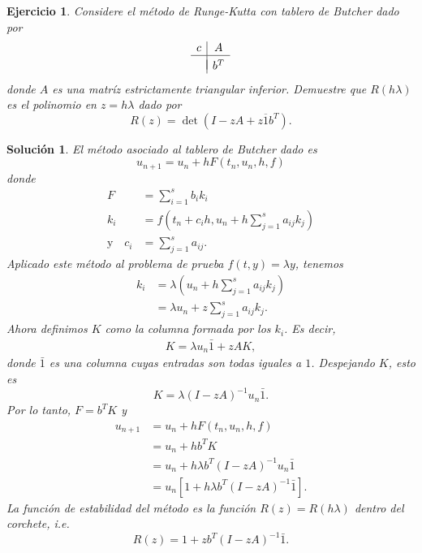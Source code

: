 \documentclass[11pt]{article}
\newtheorem{exercise}{Ejercicio}
\newtheorem*{sol}{Solución}
\newcommand\ol\overline
\begin{document}
\begin{exercise}
  Considere el método de Runge-Kutta con tablero de Butcher dado por
  \begin{equation}
    \begin{array}{c|c}
      c & A \\
      \hline \\[-3mm]
        & b^T
    \end{array}
  \end{equation}
  donde $A$ es una matríz estrictamente triangular inferior. Demuestre
  que $R(h\lambda)$ es el polinomio en $z=h\lambda$ dado por 
   \begin{equation}
    R(z) = \det(I-zA+z\ol 1 b^T)
  .\end{equation}
\end{exercise}
\begin{sol}
  El método asociado al tablero de Butcher dado es
  \begin{equation}
    u_{n+1} = u_n + h F(t_n,u_n,h,f)
  \end{equation}
  donde
  \begin{align}
    F
      &=
      \sum_{i=1}^{s}b_ik_i
    \\[-3mm]
    k_i
      &= f(t_n+c_ih, u_n+h \sum_{j=1}^{s}a_{ij} k_j)
      \\[-4mm]
    \text{y} \quad
    c_i
      &= \sum_{j=1}^{s}a_{ij}
  .\end{align}
  Aplicado este método al problema de prueba $f(t,y)=\lambda y$,
  tenemos
  \begin{align}
    k_i
    &= \lambda(u_n+h \sum_{j=1}^{s}a_{ij} k_j) \\
    &= \lambda u_n+z \sum_{j=1}^{s}a_{ij} k_j
  .\end{align}
  Ahora definimos $K$ como la columna formada por los $k_i$. Es decir,
  \begin{align}
    K = \lambda u_n\bar 1+zAK
  ,\end{align}
  donde $\bar 1$ es una columna cuyas entradas son todas iguales a
  $1$. Despejando $K$, esto es
  \begin{equation}
    K=\lambda (I-zA)^{-1}u_n\bar 1
  .\end{equation}
  Por lo tanto, $F=b^{T}K$ y
  \begin{align}
    u_{n+1}
    &= u_n + hF(t_n,u_n,h,f) \\
    &= u_n + hb^TK \\
    &= u_n + h\lambda b^T(I-zA)^{-1}u_n\bar 1 \\
    &= u_n[1 + h\lambda b^T(I-zA)^{-1}\bar 1]
  .\end{align}
  La función de estabilidad del método es la función
  $R(z)=R(h\lambda)$ dentro del corchete, i.e.
  \begin{equation}
    R(z) = 1 + zb^T(I-zA)^{-1}\bar 1
  .\end{equation}
  

\end{sol}
\end{document}
